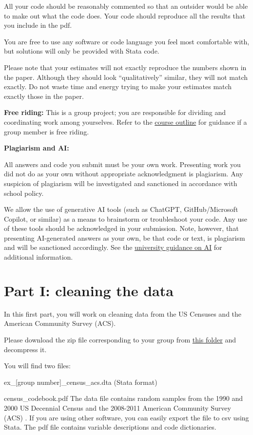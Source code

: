 \documentclass[a4paper, 11pt,addpoints]{exam}
\begin{document}
\item All your code should be reasonably commented so that an outsider would be able to make out what the code does. Your code should reproduce all the results that you include in the pdf.
\item You are free to use any software or code language you feel most comfortable with, but solutions will only be provided with Stata code.
\item Please note that your estimates will not exactly reproduce the numbers shown in the paper. Although they should look ``qualitatively'' similar, they will not match exactly. Do not waste time and energy trying to make your estimates match exactly those in the paper.
\item \textbf{Free riding:} This is a group project; you are responsible for dividing and coordinating work among yourselves. Refer to the \href{https://www.learn.ed.ac.uk/ultra/courses/_121272_1/outline/edit/document/_10205264_1?courseId=_121272_1&view=content}{course outline} for guidance if a group member is free riding.
\item \textbf{Plagiarism and AI:} 
\bitem 
\item All answers and code you submit must be your own work. Presenting work you did not do as your own without appropriate acknowledgment is plagiarism. Any suspicion of plagiarism will be investigated and sanctioned in accordance with school policy. 
\item We allow the use of generative AI tools (such as ChatGPT, GitHub/Microsoft Copilot, or similar) as a means to brainstorm or troubleshoot your code. Any use of these tools should be acknowledged in your submission. Note, however, that presenting AI-generated answers as your own, be that code or text, is plagiarism and will be sanctioned accordingly. See the \href{https://information-services.ed.ac.uk/computing/communication-and-collaboration/elm/generative-ai-guidance-for-students/using-generative}{university guidance on AI} for additional information.
\eitem 
\eitem 
\newpage 
\section*{Part I: cleaning the data}
\noindent In this first part, you will work on cleaning data from the US Censuses and the American Community Survey (ACS).
\bitem
	\item Please download the zip file corresponding to your group from \href{https://www.dropbox.com/scl/fo/g2xtn0yymiebz0wivfe7k/AGwxkhhcV-4sBT43u8ZHYL4?rlkey=a8g768pa9m9v067bg9pudg10h&dl=0}{this folder} and decompress it.
	\item You will find two files:
	\bitem 
		\item ex\_[group number]\_census\_acs.dta (Stata format)
		\item census\_codebook.pdf
	\eitem 
	The data file contains random samples from the 1990 and 2000 US Decennial Census and the 2008-2011 American Community Survey (ACS) \citep{IPUMS}. If you are using other software, you can easily export the file to csv using Stata. The pdf file contains variable descriptions and code dictionaries.
	
\end{document}
